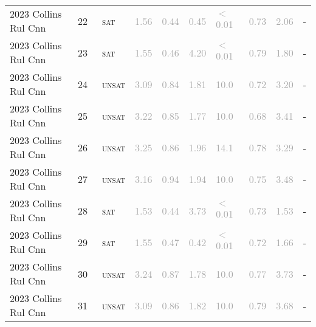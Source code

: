 \begin{center}
{\begin{longtable}{@{}llllllllll@{}}
2023 Collins Rul Cnn & 22 & ~\textsc{sat} & \textcolor{darkgray}{1.56} & \textcolor{darkgray}{0.44} & \textcolor{darkgray}{0.45} & \textcolor{darkgray}{$<$0.01} & \textcolor{darkgray}{0.73} & \textcolor{darkgray}{2.06} & - \\
2023 Collins Rul Cnn & 23 & ~\textsc{sat} & \textcolor{darkgray}{1.55} & \textcolor{darkgray}{0.46} & \textcolor{darkgray}{4.20} & \textcolor{darkgray}{$<$0.01} & \textcolor{darkgray}{0.79} & \textcolor{darkgray}{1.80} & - \\
2023 Collins Rul Cnn & 24 & ~\textsc{unsat} & \textcolor{darkgray}{3.09} & \textcolor{darkgray}{0.84} & \textcolor{darkgray}{1.81} & \textcolor{darkgray}{10.0} & \textcolor{darkgray}{0.72} & \textcolor{darkgray}{3.20} & - \\
2023 Collins Rul Cnn & 25 & ~\textsc{unsat} & \textcolor{darkgray}{3.22} & \textcolor{darkgray}{0.85} & \textcolor{darkgray}{1.77} & \textcolor{darkgray}{10.0} & \textcolor{darkgray}{0.68} & \textcolor{darkgray}{3.41} & - \\
2023 Collins Rul Cnn & 26 & ~\textsc{unsat} & \textcolor{darkgray}{3.25} & \textcolor{darkgray}{0.86} & \textcolor{darkgray}{1.96} & \textcolor{darkgray}{14.1} & \textcolor{darkgray}{0.78} & \textcolor{darkgray}{3.29} & - \\
2023 Collins Rul Cnn & 27 & ~\textsc{unsat} & \textcolor{darkgray}{3.16} & \textcolor{darkgray}{0.94} & \textcolor{darkgray}{1.94} & \textcolor{darkgray}{10.0} & \textcolor{darkgray}{0.75} & \textcolor{darkgray}{3.48} & - \\
2023 Collins Rul Cnn & 28 & ~\textsc{sat} & \textcolor{darkgray}{1.53} & \textcolor{darkgray}{0.44} & \textcolor{darkgray}{3.73} & \textcolor{darkgray}{$<$0.01} & \textcolor{darkgray}{0.73} & \textcolor{darkgray}{1.53} & - \\
2023 Collins Rul Cnn & 29 & ~\textsc{sat} & \textcolor{darkgray}{1.55} & \textcolor{darkgray}{0.47} & \textcolor{darkgray}{0.42} & \textcolor{darkgray}{$<$0.01} & \textcolor{darkgray}{0.72} & \textcolor{darkgray}{1.66} & - \\
2023 Collins Rul Cnn & 30 & ~\textsc{unsat} & \textcolor{darkgray}{3.24} & \textcolor{darkgray}{0.87} & \textcolor{darkgray}{1.78} & \textcolor{darkgray}{10.0} & \textcolor{darkgray}{0.77} & \textcolor{darkgray}{3.73} & - \\
2023 Collins Rul Cnn & 31 & ~\textsc{unsat} & \textcolor{darkgray}{3.09} & \textcolor{darkgray}{0.86} & \textcolor{darkgray}{1.82} & \textcolor{darkgray}{10.0} & \textcolor{darkgray}{0.79} & \textcolor{darkgray}{3.68} & - \\

\end{longtable}}
\end{center}
